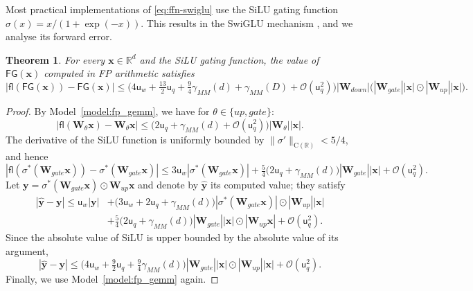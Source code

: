 \documentclass[namedate,webpdf,imanum]{ima-authoring-template}
\newcommand{\Real}{\mathbb{R}}
\newcommand{\Matrix}[1]{\mathbf{#1}}
\newcommand{\Norm}[3][]{#1\| #2 #1\|_{\mathrm{#3}}}
\newcommand{\hap}{\mathbin{\odot}}
\newcommand{\Layer}[1]{\mathsf{#1}}
\newcommand{\fl}[2][]{\mathsf{fl}#1( #2 #1)}
\newcommand{\uh}{\mathsf{u}}
\newcommand{\Oh}[2][]{\mathcal{O}#1( #2 #1)}
\newtheorem{theorem}{Theorem}[section]%
\numberwithin{equation}{section}
\begin{document}
Most practical implementations of \eqref{eq:ffn-swiglu} use the SiLU gating function $\sigma(x) = x / (1 + \exp(-x))$. 
This results in the SwiGLU mechanism \citep{shazeer2020glu}, and we analyse its forward error.

\begin{theorem}
\label{theorem:rounding-ffn-swiglu}
For every $\Matrix{x} \in \Real^d$ and the SiLU gating function, the value of $\Layer{FG}(\Matrix{x})$ computed in FP arithmetic satisfies
\begin{equation*}
    |\fl{\Layer{FG}(\Matrix{x})} - \Layer{FG}(\Matrix{x})| \leq \Big( 4 \uh_{w} + \tfrac{13}{2} \uh_{q} + \tfrac{9}{4} \gamma_{MM}(d) + \gamma_{MM}(D) + \Oh{\uh_{q}^2} \Big) |\Matrix{W}_{down}| \Big( |\Matrix{W}_{gate}| |\Matrix{x}| \hap |\Matrix{W}_{up}| |\Matrix{x}| \Big).
\end{equation*}
\end{theorem}
\begin{proof}
By Model~\ref{model:fp_gemm}, we have for $\theta \in \{ up, gate \}$:
\begin{equation*}
    |\fl{\Matrix{W}_{\theta} \Matrix{x}} - \Matrix{W}_{\theta} \Matrix{x}| \leq \Big( 2 \uh_{q} + \gamma_{MM}(d) + \Oh{\uh_{q}^2} \Big) |\Matrix{W}_{\theta}| |\Matrix{x}|.
\end{equation*}
The derivative of the SiLU function is uniformly bounded by $\Norm{\sigma'}{C(\Real)} < 5/4$, and hence
\begin{equation*}
    |\fl{\sigma^\ast(\Matrix{W}_{gate} \Matrix{x})} - \sigma^\ast(\Matrix{W}_{gate} \Matrix{x})| \leq 3 \uh_{w} |\sigma^\ast(\Matrix{W}_{gate} \Matrix{x})| + \tfrac{5}{4} \Big( 2 \uh_{q} + \gamma_{MM}(d) \Big) |\Matrix{W}_{gate}| |\Matrix{x}| + \Oh{\uh_{q}^2}.
\end{equation*}
Let $\Matrix{y} = \sigma^\ast(\Matrix{W}_{gate} \Matrix{x}) \hap \Matrix{W}_{up} \Matrix{x}$ and denote by $\hat{\Matrix{y}}$ its computed value; they satisfy
\begin{align*}
    |\hat{\Matrix{y}} - \Matrix{y}| \leq \uh_{w} |\Matrix{y}| &+ \Big( 3 \uh_{w} + 2\uh_{q} + \gamma_{MM}(d) \Big) |\sigma^\ast(\Matrix{W}_{gate} \Matrix{x})| \hap |\Matrix{W}_{up}| |\Matrix{x}| \\
    &+ \tfrac{5}{4} \Big( 2 \uh_{q} + \gamma_{MM}(d) \Big) |\Matrix{W}_{gate}| |\Matrix{x}| \hap |\Matrix{W}_{up} \Matrix{x}| + \Oh{\uh_{q}^2}.
\end{align*}
Since the absolute value of SiLU is upper bounded by the absolute value of its argument,
\begin{equation*}
    |\hat{\Matrix{y}} - \Matrix{y}| \leq \Big( 4 \uh_{w} + \tfrac{9}{2} \uh_{q} + \tfrac{9}{4} \gamma_{MM}(d) \Big) |\Matrix{W}_{gate}| |\Matrix{x}| \hap |\Matrix{W}_{up}| |\Matrix{x}| + \Oh{\uh_{q}^2}.
\end{equation*}
Finally, we use Model~\ref{model:fp_gemm} again.
\end{proof}
\end{document}
